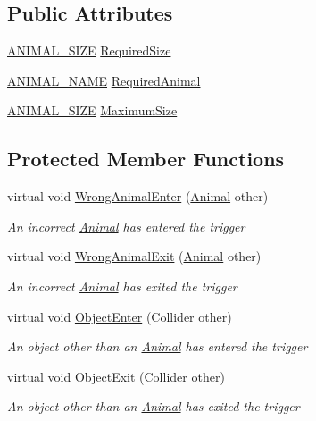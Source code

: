 \subsection*{Public Attributes}
\begin{DoxyCompactItemize}
\item 
\mbox{\hyperlink{_animal_8cs_ad0d15cd79bb3e3a97e7fb817f1438fcc}{A\+N\+I\+M\+A\+L\+\_\+\+S\+I\+ZE}} \mbox{\hyperlink{class_animal_trigger_a8df6a540a57c386c2f76a4554ee7e057}{Required\+Size}}
\item 
\mbox{\hyperlink{_animal_8cs_a2fa5713399b84d1b88dae9196837af50}{A\+N\+I\+M\+A\+L\+\_\+\+N\+A\+ME}} \mbox{\hyperlink{class_animal_trigger_aea34d32ba37a524d791680718161f31c}{Required\+Animal}}
\item 
\mbox{\hyperlink{_animal_8cs_ad0d15cd79bb3e3a97e7fb817f1438fcc}{A\+N\+I\+M\+A\+L\+\_\+\+S\+I\+ZE}} \mbox{\hyperlink{class_animal_trigger_ac9754af1da0271dfa7f677485953a0bb}{Maximum\+Size}}
\end{DoxyCompactItemize}
\subsection*{Protected Member Functions}
\begin{DoxyCompactItemize}
\item 
virtual void \mbox{\hyperlink{class_animal_trigger_a7a27e866d74251de063bb4a36c99e99d}{Wrong\+Animal\+Enter}} (\mbox{\hyperlink{class_animal}{Animal}} other)
\begin{DoxyCompactList}\small\item\em An incorrect \mbox{\hyperlink{class_animal}{Animal}} has entered the trigger \end{DoxyCompactList}\item 
virtual void \mbox{\hyperlink{class_animal_trigger_abbdf7b21fc9595ff639b96e6baecec46}{Wrong\+Animal\+Exit}} (\mbox{\hyperlink{class_animal}{Animal}} other)
\begin{DoxyCompactList}\small\item\em An incorrect \mbox{\hyperlink{class_animal}{Animal}} has exited the trigger \end{DoxyCompactList}\item 
virtual void \mbox{\hyperlink{class_animal_trigger_ac9d6fbc38448a5369e5658ae0774bd58}{Object\+Enter}} (Collider other)
\begin{DoxyCompactList}\small\item\em An object other than an \mbox{\hyperlink{class_animal}{Animal}} has entered the trigger \end{DoxyCompactList}\item 
virtual void \mbox{\hyperlink{class_animal_trigger_aad4a0cd7f224897b7d810429e05b038a}{Object\+Exit}} (Collider other)
\begin{DoxyCompactList}\small\item\em An object other than an \mbox{\hyperlink{class_animal}{Animal}} has exited the trigger \end{DoxyCompactList}\end{DoxyCompactItemize}
